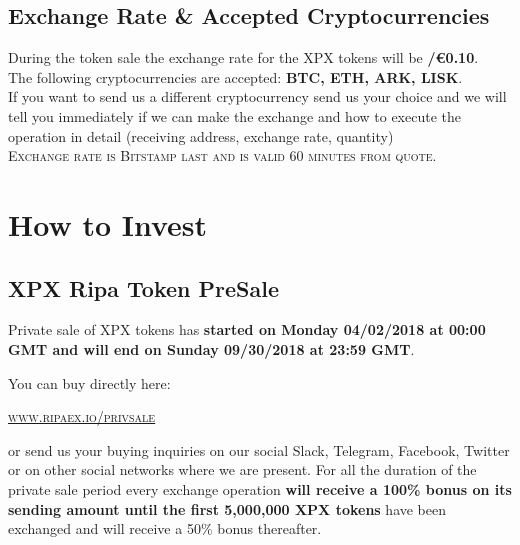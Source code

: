 \documentclass[11pt,fleqn,oneside]{book} %
\begin{document}
\subsection{Exchange Rate \& Accepted Cryptocurrencies}
During the token sale the exchange rate for the XPX tokens will be \textbf{\PHP/\euro0.10}.\\

The following cryptocurrencies are accepted: \textbf{BTC, ETH, ARK, LISK}.\\

If you want to send us a different cryptocurrency send us your choice and we will tell you immediately if we can make 
the exchange and how to execute the operation in detail (receiving address, exchange rate, quantity)\\

\textsc{Exchange rate is Bitstamp last and is valid 60 minutes from quote}.

\section{How to Invest}
\subsection{XPX Ripa Token PreSale}
Private sale of XPX tokens has \textbf{started on Monday 04/02/2018 at 00:00 GMT and will end on Sunday 09/30/2018 at 23:59 GMT}.

You can buy directly here: 
\begin{center}
	\href{https://www.ripaex.io/privsale}{\textsc{www.ripaex.io/privsale}}
\end{center}

or send us your buying inquiries on our social Slack, Telegram, Facebook, Twitter or on other social networks where we are present.
For all the duration of the private sale period every exchange operation \textbf{will receive a 100\% bonus on its sending amount
until the first 5,000,000 XPX tokens} have been exchanged and will receive a 50\% bonus thereafter.
\end{document}
